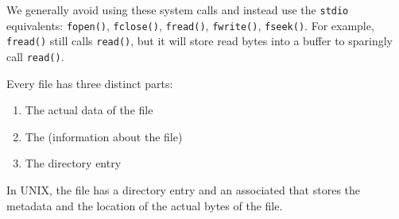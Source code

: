 \documentclass[12pt]{report}
\begin{document}
\begin{notebox}
    We generally avoid using these system calls and instead use the \texttt{stdio} equivalents: \texttt{fopen()}, \texttt{fclose()}, \texttt{fread()}, \texttt{fwrite()}, \texttt{fseek()}. For example, \texttt{fread()} still calls \texttt{read()}, but it will store read bytes into a buffer to sparingly call \texttt{read()}.
\end{notebox}

Every file has three distinct parts:
\begin{enumerate}[noitemsep]
    \item The actual data of the file
    \item The  (information about the file)
    \item The directory entry
\end{enumerate}

In UNIX, the file has a directory entry and an associated  that stores the metadata and the location of the actual bytes of the file.

\amzindex
\end{document}

